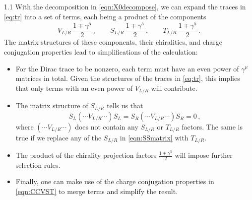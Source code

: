 \documentclass[a4paper,12pt]{article}
\begin{document}
\begin{spacing}{1.1}
With the decomposition in \cref{eqn:X0decompose}, we can expand the traces in \cref{eq:tr} into a set of terms, each being a product of the components
\begin{equation}
V_{L/R}\, \frac{1\mp\gamma^5}{2} \,,\qquad
S_{L/R}\, \frac{1\mp\gamma^5}{2} \,,\qquad
T_{L/R}\, \frac{1\mp\gamma^5}{2} \,.
\end{equation}
The matrix structures of these components, their chiralities, and charge conjugation properties lead to simplifications of the calculation:
\begin{itemize}
\item For the Dirac trace to be nonzero, each term must have an even power of $\gamma^\mu$ matrices in total. Given the structures of the traces in \cref{eq:tr}, this implies that only terms with an even power of $V_{L/R}$ will contribute.
\item The matrix structure of $S_{L/R}$ tells us that
\begin{equation}
S_L \left( \cdots V_{L/R} \cdots \right) S_L = S_R \left( \cdots V_{L/R} \cdots \right) S_R = 0 \,,
\label{eqn:SSmatrix}
\end{equation}
where $\left( \cdots V_{L/R} \cdots \right)$ does not contain any $S_{L/R}$ or $T_{L/R}$ factors. The same is true if we replace any of the $S_{L/R}$ in \cref{eqn:SSmatrix} with $T_{L/R}$.
\item The product of the chirality projection factors $\frac{1\mp\gamma^5}{2}$ will impose further selection rules.
\item Finally, one can make use of the charge conjugation properties in \cref{eqn:CCVST} to merge terms and simplify the result.
\end{itemize}


\end{spacing}
\end{document}
